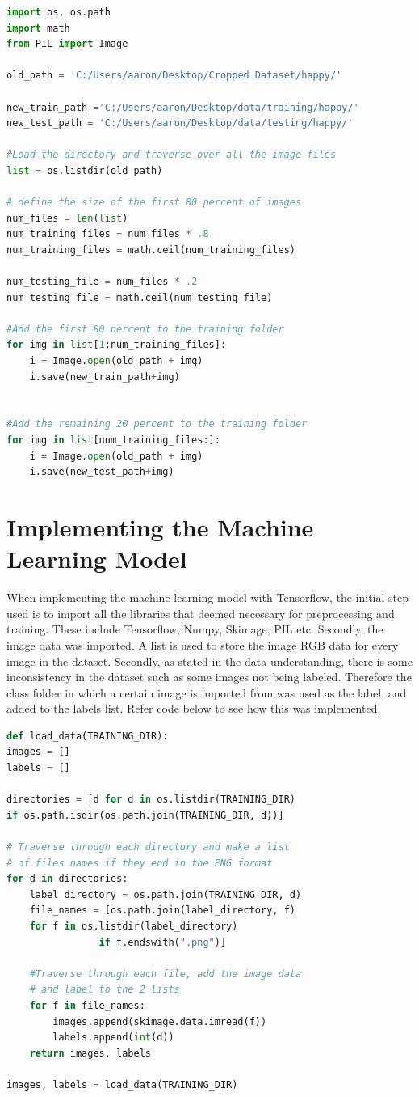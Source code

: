 \begin{lstlisting}[language=Python, frame=single]
import os, os.path
import math
from PIL import Image

old_path = 'C:/Users/aaron/Desktop/Cropped Dataset/happy/'

new_train_path ='C:/Users/aaron/Desktop/data/training/happy/'
new_test_path = 'C:/Users/aaron/Desktop/data/testing/happy/'

#Load the directory and traverse over all the image files
list = os.listdir(old_path)

# define the size of the first 80 percent of images
num_files = len(list)
num_training_files = num_files * .8
num_training_files = math.ceil(num_training_files)

num_testing_file = num_files * .2
num_testing_file = math.ceil(num_testing_file)

#Add the first 80 percent to the training folder
for img in list[1:num_training_files]: 
	i = Image.open(old_path + img)
	i.save(new_train_path+img)


#Add the remaining 20 percent to the training folder
for img in list[num_training_files:]:
	i = Image.open(old_path + img)
	i.save(new_test_path+img)
\end{lstlisting}

\section{Implementing the Machine Learning Model}

When implementing the machine learning model with Tensorflow, the initial step used is to import all the libraries that deemed necessary for preprocessing and training. These include Tensorflow, Numpy, Skimage, PIL etc. Secondly, the image data was imported. A list is used to store the image RGB data for every image in the dataset. Secondly, as stated in the data understanding, there is some inconsistency in the dataset such as some images not being labeled. Therefore the class folder in which a certain image is imported from was used as the label, and added to the labels list. Refer code below to see how this was implemented.

\begin{lstlisting}[language=Python, frame=single]
def load_data(TRAINING_DIR):
images = []
labels = []

directories = [d for d in os.listdir(TRAINING_DIR) 
if os.path.isdir(os.path.join(TRAINING_DIR, d))]

# Traverse through each directory and make a list
# of files names if they end in the PNG format
for d in directories:
	label_directory = os.path.join(TRAINING_DIR, d)
	file_names = [os.path.join(label_directory, f) 
	for f in os.listdir(label_directory) 
				if f.endswith(".png")]
	
	#Traverse through each file, add the image data
	# and label to the 2 lists
	for f in file_names:
		images.append(skimage.data.imread(f))
		labels.append(int(d))
	return images, labels

images, labels = load_data(TRAINING_DIR)
\end{lstlisting}


